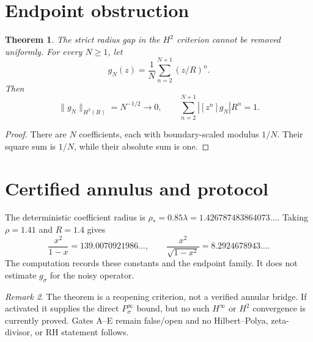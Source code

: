 \documentclass[11pt]{article}
\newtheorem{theorem}{Theorem}[section]
\theoremstyle{remark}\newtheorem{remark}[theorem]{Remark}
\begin{document}
\section{Endpoint obstruction}
\begin{theorem}\label{thm:endpoint}
The strict radius gap in the $H^2$ criterion cannot be removed uniformly.
For every $N\ge1$, let
\[
 g_N(z)=\frac1N\sum_{n=2}^{N+1}(z/R)^n.
\]
Then
\[
 \|g_N\|_{H^2(R)}=N^{-1/2}\longrightarrow0,
\qquad
 \sum_{n=2}^{N+1}|[z^n]g_N|R^n=1.
\]
\end{theorem}
\begin{proof}
There are $N$ coefficients, each with boundary-scaled modulus $1/N$.
Their square sum is $1/N$, while their absolute sum is one.
\end{proof}

\section{Certified annulus and protocol}
The deterministic coefficient radius is
$\rho_*=0.85\lambda=1.426787483864073\ldots$.  Taking $\rho=1.41$ and
$R=1.4$ gives
\[
 \frac{x^2}{1-x}=139.0070921986\ldots,\qquad
 \frac{x^2}{\sqrt{1-x^2}}=8.2924678943\ldots.
\]
The computation records these constants and the endpoint family.  It does
not estimate $g_\sigma$ for the noisy operator.

\begin{remark}
The theorem is a reopening criterion, not a verified annular bridge.  If
activated it supplies the direct $P_\sigma^\infty$ bound, but no such
$H^\infty$ or $H^2$ convergence is currently proved.  Gates A--E remain
false/open and no
Hilbert--Polya, zeta-divisor, or RH statement follows.
\end{remark}
\end{document}
